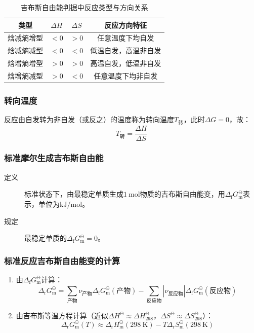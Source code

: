 \begin{table}[ht]
\centering
\small
\caption*{吉布斯自由能判据中反应类型与方向关系}
\begin{tabular}{cccc}
\toprule
类型       & $\Delta H$ & $\Delta S$ & 反应方向特征 \\
\midrule
焓减熵增型 & $<0$       & $>0$       & 任意温度下均自发 \\
焓减熵减型 & $<0$       & $<0$       & 低温自发，高温非自发 \\
焓增熵增型 & $>0$       & $>0$       & 高温自发，低温非自发 \\
焓增熵减型 & $>0$       & $<0$       & 任意温度下均非自发 \\
\bottomrule
\end{tabular}
\end{table}

\subsubsection{转向温度}
反应由自发转为非自发（或反之）的温度称为转向温度$T_{\text{转}}$，此时$\Delta G=0$，故：
\[
T_{\text{转}} = \frac{\Delta H}{\Delta S}
\]

\subsubsection{标准摩尔生成吉布斯自由能}
\begin{description}
    \item[定义] 标准状态下，由最稳定单质生成$\qty{1}{\mole}$物质的吉布斯自由能变，用$\Delta_{\text{f}}G_{\text{m}}^\ominus$表示，单位为$\si{\kilo\joule\per\mole}$。
    \item[规定] 最稳定单质的$\Delta_{\text{f}}G_{\text{m}}^\ominus=0$。
\end{description}

\subsubsection{标准反应吉布斯自由能变的计算}
\begin{enumerate}
    \item 由$\Delta_{\text{f}}G_{\text{m}}^\ominus$计算：
    \[
    \Delta_{\text{r}}G_{\text{m}}^\ominus = \sum_{\text{产物}}\nu_{\text{产物}}\Delta_{\text{f}}G_{\text{m}}^\ominus(\text{产物}) - \sum_{\text{反应物}}|\nu_{\text{反应物}}|\Delta_{\text{f}}G_{\text{m}}^\ominus(\text{反应物})
    \]
    \item 由吉布斯等温方程计算（近似$\Delta H^\ominus\approx\Delta H_{298}^\ominus$，$\Delta S^\ominus\approx\Delta S_{298}^\ominus$）：
    \[
    \Delta_{\text{r}}G_{\text{m}}^\ominus(T) \approx \Delta_{\text{r}}H_{\text{m}}^\ominus(\qty{298}{\kelvin}) - T\Delta_{\text{r}}S_{\text{m}}^\ominus(\qty{298}{\kelvin})
    \]
\end{enumerate}

